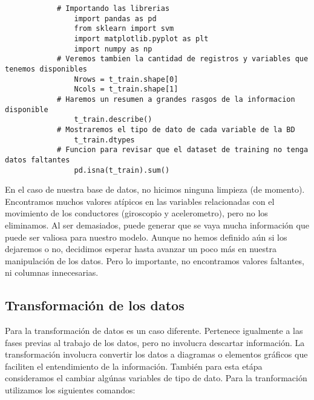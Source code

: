 \documentclass{article}
\begin{document}
        \begin{lstlisting}
            # Importando las librerias
                import pandas as pd
                from sklearn import svm
                import matplotlib.pyplot as plt
                import numpy as np
            # Veremos tambien la cantidad de registros y variables que tenemos disponibles
                Nrows = t_train.shape[0]
                Ncols = t_train.shape[1]
            # Haremos un resumen a grandes rasgos de la informacion disponible
                t_train.describe()
            # Mostraremos el tipo de dato de cada variable de la BD
                t_train.dtypes
            # Funcion para revisar que el dataset de training no tenga datos faltantes
                pd.isna(t_train).sum()
        \end{lstlisting}

        En el caso de nuestra base de datos, no hicimos ninguna limpieza (de momento). Encontramos muchos valores atípicos en las variables relacionadas con el movimiento de los conductores (giroscopio y acelerometro), pero no los eliminamos. Al ser demasiados, puede generar que se vaya mucha información que puede ser valiosa para nuestro modelo. Aunque no hemos definido aún si los dejaremos o no, decidimos esperar hasta avanzar un poco más en nuestra manipulación de los datos. Pero lo importante, no encontramos valores faltantes, ni columnas innecesarias.
    

    \subsection{Transformación de los datos}

        Para la transformación de datos es un caso diferente. Pertenece igualmente a las fases previas al trabajo de los datos, pero no involucra descartar información. La transformación involucra convertir los datos a diagramas o elementos gráficos que faciliten el entendimiento de la información. También para esta etápa consideramos el cambiar algúnas variables de tipo de dato. Para la tranformación utilizamos los siguientes comandos:
\end{document}

